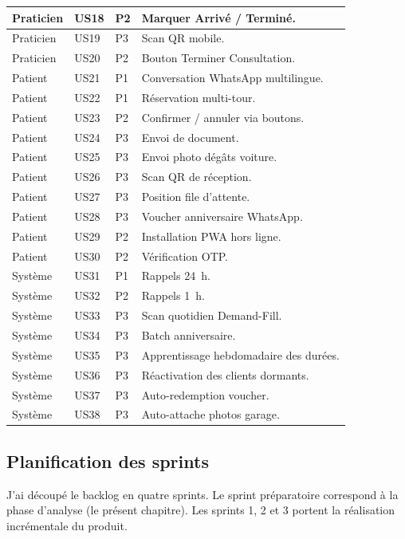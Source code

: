 {\begin{longtable}{|p{1.6cm}|p{1.4cm}|p{1.4cm}|p{8.5cm}|}
  \hline
  Praticien & US18 & P2 & Marquer Arrivé / Terminé. \\
  \hline
  Praticien & US19 & P3 & Scan QR mobile. \\
  \hline
  Praticien & US20 & P2 & Bouton Terminer Consultation. \\
  \hline
  Patient   & US21 & P1 & Conversation WhatsApp multilingue. \\
  \hline
  Patient   & US22 & P1 & Réservation multi-tour. \\
  \hline
  Patient   & US23 & P2 & Confirmer / annuler via boutons. \\
  \hline
  Patient   & US24 & P3 & Envoi de document. \\
  \hline
  Patient   & US25 & P3 & Envoi photo dégâts voiture. \\
  \hline
  Patient   & US26 & P3 & Scan QR de réception. \\
  \hline
  Patient   & US27 & P3 & Position file d'attente. \\
  \hline
  Patient   & US28 & P3 & Voucher anniversaire WhatsApp. \\
  \hline
  Patient   & US29 & P2 & Installation PWA hors ligne. \\
  \hline
  Patient   & US30 & P2 & Vérification OTP. \\
  \hline
  Système   & US31 & P1 & Rappels 24~h. \\
  \hline
  Système   & US32 & P2 & Rappels 1~h. \\
  \hline
  Système   & US33 & P3 & Scan quotidien Demand-Fill. \\
  \hline
  Système   & US34 & P3 & Batch anniversaire. \\
  \hline
  Système   & US35 & P3 & Apprentissage hebdomadaire des durées. \\
  \hline
  Système   & US36 & P3 & Réactivation des clients dormants. \\
  \hline
  Système   & US37 & P3 & Auto-redemption voucher. \\
  \hline
  Système   & US38 & P3 & Auto-attache photos garage. \\
\end{longtable}
}

\subsection{Planification des sprints}
J'ai découpé le backlog en quatre sprints. Le sprint préparatoire
correspond à la phase d'analyse (le présent chapitre). Les sprints
1, 2 et 3 portent la réalisation incrémentale du produit.

